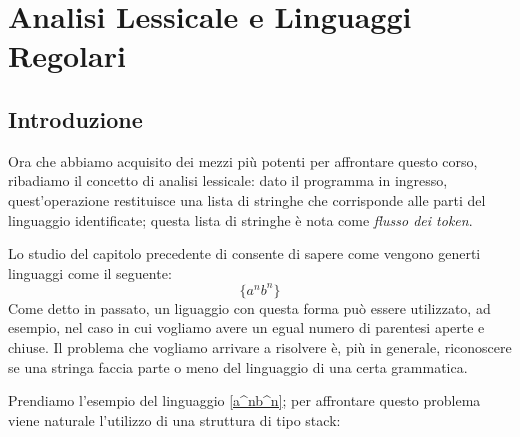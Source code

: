 \documentclass[class=book, crop=false, oneside, 12pt]{standalone}
\begin{document}
\chapter{Analisi Lessicale e Linguaggi Regolari}

\section{Introduzione}

Ora che abbiamo acquisito dei mezzi più potenti per affrontare questo corso, ribadiamo il concetto di analisi lessicale: dato il programma in ingresso, quest'operazione restituisce una lista di stringhe che corrisponde alle parti del linguaggio identificate; questa lista di stringhe è nota come \emph{flusso dei token}.

Lo studio del capitolo precedente di consente di sapere come vengono generti linguaggi come il seguente:
\begin{equation*}
    \label{a^nb^n}
    \{a^n b^n\}    
\end{equation*}
Come detto in passato, un liguaggio con questa forma può essere utilizzato, ad esempio, nel caso in cui vogliamo avere un egual numero di parentesi aperte e chiuse.
Il problema che vogliamo arrivare a risolvere è, più in generale, riconoscere se una stringa faccia parte o meno del linguaggio di una certa grammatica.

Prendiamo l’esempio del linguaggio \ref{a^nb^n}; per affrontare questo problema viene naturale l'utilizzo di una struttura di tipo stack:
\end{document}
